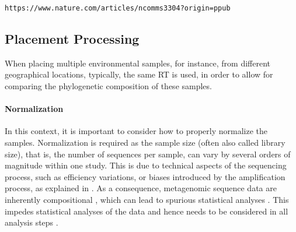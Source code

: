  \verb|https://www.nature.com/articles/ncomms3304?origin=ppub|



\subsection{Placement Processing}
\label{ch:Foundations:sec:PhylogeneticPlacement:sub:PlacementProcessing}

When placing multiple environmental samples, for instance, from different geographical locations,
typically, the same \ac{RT} is used, in order to allow for comparing the phylogenetic composition of these samples.

\paragraph{Normalization}
\label{ch:Foundations:sec:PhylogeneticPlacement:sub:PlacementProcessing:par:Normalization}

In this context, it is important to consider how to properly normalize the samples.
Normalization is required as the sample size (often also called library size),
that is, the number of sequences per sample, can vary by several orders of magnitude within one study.
This is due to technical aspects of the sequencing process, such as efficiency variations,
or biases introduced by the amplification process,
as explained in .
As a consequence, metagenomic sequence data are inherently compositional \cite{Gloor2017},
which can lead to spurious statistical analyses \cite{Aitchison1986,Jackson1997,Tsilimigras2016,Gloor2016a}.
This impedes statistical analyses of the data and hence needs to be considered in all analysis steps \cite{Silverman2017}.

